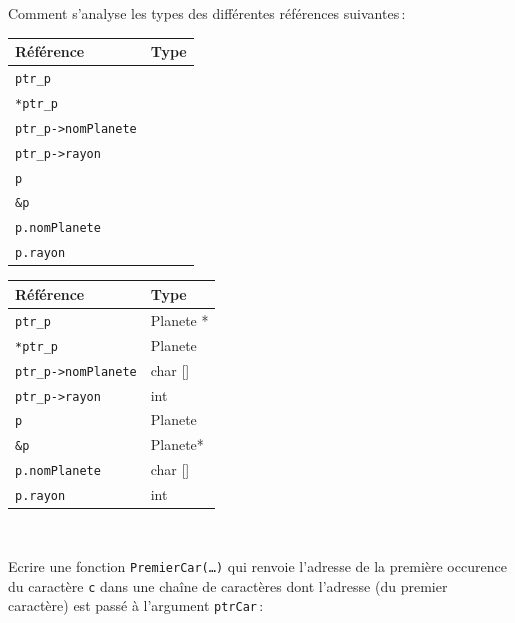 \documentclass[10pt]{article}\usepackage[nu]{esial}
\begin{document}
\bigskip Comment s'analyse les types des différentes références
suivantes\,:

\bigskip

\begin{tabular}{|p{.2\linewidth}|p{.3\linewidth}|}
  \hline
  Référence  &             Type         \\\hline
  \verb+ptr_p+     &               \\\hline                  
  \verb+*ptr_p+         &         \\\hline            
  \verb+ptr_p->nomPlanete+& \\\hline
  \verb+ptr_p->rayon+& \\\hline
  \verb+p+& \\\hline
  \verb+&p+& \\\hline
  \verb+p.nomPlanete+& \\\hline
  \verb+p.rayon+& \\\hline
\end{tabular}


\begin{Reponse}

\begin{tabular}{|p{.2\linewidth}|p{.3\linewidth}|}
  \hline
  Référence  &             Type         \\\hline
  \verb+ptr_p+     &      Planete *         \\\hline                  
  \verb+*ptr_p+         &  Planete       \\\hline            
  \verb+ptr_p->nomPlanete+& char []\\\hline
  \verb+ptr_p->rayon+& int\\\hline
  \verb+p+& Planete\\\hline
  \verb+&p+& Planete*\\\hline
  \verb+p.nomPlanete+& char []\\\hline
  \verb+p.rayon+& int\\\hline
\end{tabular}
~
\end{Reponse}


 


\bigskip\bigskip{}

Ecrire une fonction {\tt PremierCar(\ldots)} qui renvoie l'adresse de
la première occurence du 
caractère {\tt c} dans une chaîne de caractères dont l'adresse (du
premier caractère) est passé à l'argument {\tt ptrCar}\,:
\end{document}
